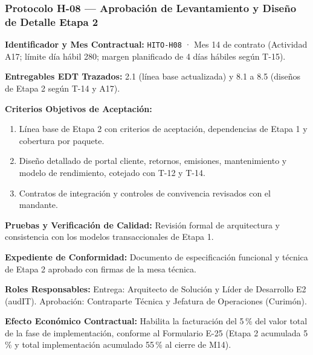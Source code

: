 \subsubsection*{Protocolo H-08 — Aprobación de Levantamiento y Diseño de Detalle Etapa 2}\label{sec:9-proto-h8}
\par\noindent\textbf{Identificador y Mes Contractual:} \texttt{HITO-H08} · Mes 14 de contrato (Actividad A17; límite día hábil 280; margen planificado de 4 días hábiles según T-15).\par
\par\noindent\textbf{Entregables EDT Trazados:} 2.1 (línea base actualizada) y 8.1 a 8.5 (diseños de Etapa 2 según T-14 y A17).\par
\par\noindent\textbf{Criterios Objetivos de Aceptación:}
\begin{enumerate}
  \item Línea base de Etapa 2 con criterios de aceptación, dependencias de Etapa 1 y cobertura por paquete.
  \item Diseño detallado de portal cliente, retornos, emisiones, mantenimiento y modelo de rendimiento, cotejado con T-12 y T-14.
  \item Contratos de integración y controles de convivencia revisados con el mandante.
\end{enumerate}
\par\noindent\textbf{Pruebas y Verificación de Calidad:} Revisión formal de arquitectura y consistencia con los modelos transaccionales de Etapa 1.\par
\par\noindent\textbf{Expediente de Conformidad:} Documento de especificación funcional y técnica de Etapa 2 aprobado con firmas de la mesa técnica.\par
\par\noindent\textbf{Roles Responsables:} Entrega: Arquitecto de Solución y Líder de Desarrollo E2 (audIT). Aprobación: Contraparte Técnica y Jefatura de Operaciones (Curimón).\par
\par\noindent\textbf{Efecto Económico Contractual:} Habilita la facturación del 5\,\% del valor total de la fase de implementación, conforme al Formulario E-25 (Etapa 2 acumulada 5\,\% y total implementación acumulado 55\,\% al cierre de M14).\par

